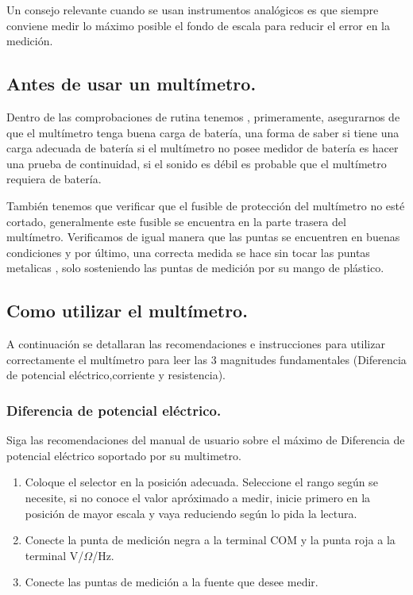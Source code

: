 \documentclass[10pt]{article}
\begin{document}
\begin{multicols}{2}
Un consejo relevante cuando se usan instrumentos analógicos es que siempre conviene medir lo máximo posible el fondo de escala para reducir el error en la medición.

\subsection{Antes de usar un multímetro.}
Dentro de las comprobaciones de rutina tenemos , primeramente, asegurarnos de que el multímetro tenga buena carga de batería, una forma de saber si tiene una carga adecuada de batería si el multímetro no posee medidor de batería es hacer una prueba de continuidad, si el sonido
es débil es probable que el multímetro requiera de batería.

También tenemos que verificar que el fusible de protección del multímetro no esté cortado, generalmente este fusible se encuentra en la parte trasera del multímetro. Verificamos de igual manera que las puntas se encuentren en buenas condiciones y por último, una correcta medida se hace
sin tocar las puntas metalicas , solo sosteniendo las puntas de medición por su mango de plástico.

\subsection{Como utilizar el multímetro.}

A continuación se detallaran las recomendaciones e instrucciones para utilizar correctamente el multímetro para leer las 3 magnitudes fundamentales (Diferencia de potencial eléctrico,corriente y resistencia).
\subsubsection{Diferencia de potencial eléctrico.}

Siga las recomendaciones del manual de usuario sobre el máximo de Diferencia de potencial eléctrico soportado por su multimetro.
\begin{enumerate}
	\item Coloque el selector en la posición adecuada. Seleccione el rango según se necesite, si no conoce el valor apróximado a medir, inicie primero en la posición de mayor escala y vaya reduciendo según lo pida la lectura.
	\item Conecte la punta de medición negra a la terminal COM y la punta roja a la terminal V/$\Omega$/Hz.
	\item Conecte las puntas de medición a la fuente que desee medir.
\end{enumerate}


\end{multicols}
\end{document}
